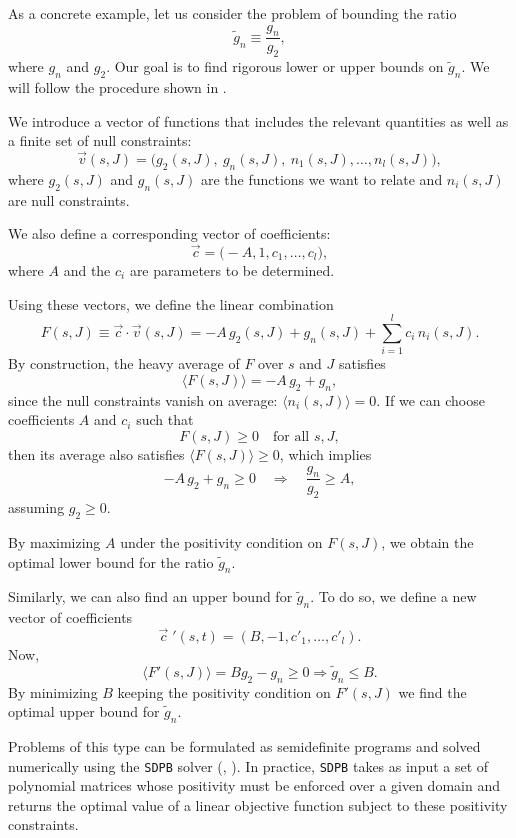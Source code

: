 As a concrete example, let us consider the problem of bounding the ratio
\[
\tilde{g}_n \equiv \frac{g_n}{g_2},
\]
where $g_n$ and $g_2$. Our goal is to find rigorous lower or upper bounds on $\tilde{g}_n$. We will follow the procedure shown in \autocite{Caron-Huot:2020cmc}.

We introduce a vector of functions that includes the relevant quantities as well as a finite set of null constraints:
\[
\vec{v}(s,J) = \big(g_2(s,J),\ g_n(s,J),\ n_1(s,J), \dots, n_l(s,J) \big),
\]
where
$g_2(s,J)$ and $g_n(s,J)$ are the functions we want to relate and $n_i(s,J)$ are null constraints.

We also define a corresponding vector of coefficients:
\[
\vec{c} = \big(-A, 1, c_1, \dots, c_l \big),
\]
where $A$ and the $c_i$ are parameters to be determined.  


Using these vectors, we define the linear combination
\[
F(s,J) \equiv \vec{c} \cdot \vec{v}(s,J) 
= -A \, g_2(s,J) + g_n(s,J) + \sum_{i=1}^l c_i\, n_i(s,J).
\]
By construction, the heavy average of $F$ over $s$ and $J$ satisfies
\[
\langle F(s,J) \rangle = -A \, g_2 + g_n,
\]
since the null constraints vanish on average: $\langle n_i(s,J) \rangle = 0$.  
If we can choose coefficients $A$ and $c_i$ such that 
\[
F(s,J) \ge 0 \quad \text{for all } s,J,
\]
then its average also satisfies $\langle F(s,J) \rangle \ge 0$, which implies
\[
-A \, g_2 + g_n \ge 0 \quad \Rightarrow \quad \frac{g_n}{g_2} \ge A,
\]
assuming $g_2 \ge 0$.  

By maximizing $A$ under the positivity condition on $F(s,J)$, we obtain the optimal lower bound for the ratio $\tilde{g}_n$. 

Similarly, we can also find an upper bound for $\tilde{g}_n$. To do so, we define a new vector of coefficients 
\begin{equation}
    \vec{c}{\;'}(s,t) = (B, -1, c'_1, \ldots, c'_l).
\end{equation}
Now, 
\begin{equation}
    \langle F'(s, J) \rangle = Bg_2 - g_n \geq 0 \Rightarrow \tilde{g}_n \leq B.
\end{equation}
By minimizing $B$ keeping the positivity condition on $F'(s,J)$ we find the optimal upper bound for $\tilde{g}_n$.

Problems of this type can be formulated as semidefinite programs and solved numerically using the \texttt{SDPB} solver (\autocite{Simmons-Duffin:2015qma}, \autocite{Landry:2019qug}). In practice, \texttt{SDPB} takes as input a set of polynomial matrices whose positivity must be enforced over a given domain and returns the optimal value of a linear objective function subject to these positivity constraints.

